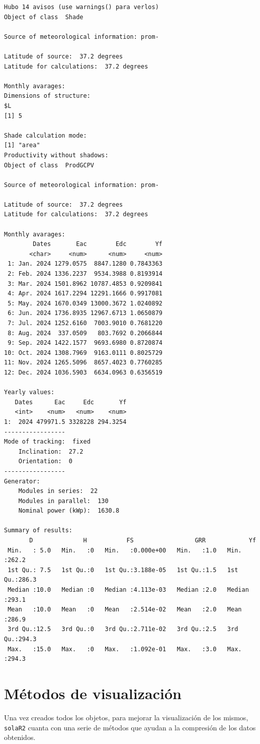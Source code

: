 \begin{verbatim}
Hubo 14 avisos (use warnings() para verlos)
Object of class  Shade 

Source of meteorological information: prom- 

Latitude of source:  37.2 degrees
Latitude for calculations:  37.2 degrees

Monthly avarages:
Dimensions of structure:
$L
[1] 5

Shade calculation mode:
[1] "area"
Productivity without shadows:
Object of class  ProdGCPV 

Source of meteorological information: prom- 

Latitude of source:  37.2 degrees
Latitude for calculations:  37.2 degrees

Monthly avarages:
        Dates       Eac        Edc        Yf
       <char>     <num>      <num>     <num>
 1: Jan. 2024 1279.0575  8847.1280 0.7843363
 2: Feb. 2024 1336.2237  9534.3988 0.8193914
 3: Mar. 2024 1501.8962 10787.4853 0.9209841
 4: Apr. 2024 1617.2294 12291.1666 0.9917081
 5: May. 2024 1670.0349 13000.3672 1.0240892
 6: Jun. 2024 1736.8935 12967.6713 1.0650879
 7: Jul. 2024 1252.6160  7003.9010 0.7681220
 8: Aug. 2024  337.0509   803.7692 0.2066844
 9: Sep. 2024 1422.1577  9693.6980 0.8720874
10: Oct. 2024 1308.7969  9163.0111 0.8025729
11: Nov. 2024 1265.5096  8657.4023 0.7760285
12: Dec. 2024 1036.5903  6634.0963 0.6356519

Yearly values:
   Dates      Eac     Edc       Yf
   <int>    <num>   <num>    <num>
1:  2024 479971.5 3328228 294.3254
-----------------
Mode of tracking:  fixed 
    Inclination:  27.2 
    Orientation:  0 
-----------------
Generator:
    Modules in series:  22 
    Modules in parallel:  130 
    Nominal power (kWp):  1630.8 

Summary of results:
       D              H           FS                 GRR            Yf       
 Min.   : 5.0   Min.   :0   Min.   :0.000e+00   Min.   :1.0   Min.   :262.2  
 1st Qu.: 7.5   1st Qu.:0   1st Qu.:3.188e-05   1st Qu.:1.5   1st Qu.:286.3  
 Median :10.0   Median :0   Median :4.113e-03   Median :2.0   Median :293.1  
 Mean   :10.0   Mean   :0   Mean   :2.514e-02   Mean   :2.0   Mean   :286.9  
 3rd Qu.:12.5   3rd Qu.:0   3rd Qu.:2.711e-02   3rd Qu.:2.5   3rd Qu.:294.3  
 Max.   :15.0   Max.   :0   Max.   :1.092e-01   Max.   :3.0   Max.   :294.3
\end{verbatim}

\section{Métodos de visualización}
\label{sec:org2dddc5b}
\label{sec:metodos-visualizacion}
Una vez creados todos los objetos, para mejorar la visualización de los mismos, \texttt{solaR2} cuanta con una serie de métodos que ayudan a la compresión de los datos obtenidos.


